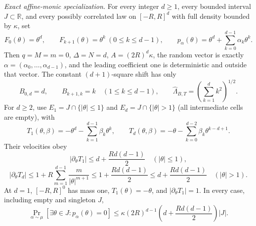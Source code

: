 \begin{theorem}
\emph{Exact affine-monic specialization.} For every integer $d\geq1$, every bounded interval
$J\subset\mathbb R$, and every possibly correlated law on $[-R,R]^d$ with full density bounded by $\kappa$,
set
\begin{equation}
\label{eq:main-display-009}
F_0(\theta)=\theta^d,\qquad F_{k+1}(\theta)=\theta^k\ (0\leq k\leq d-1),\qquad
p_\alpha(\theta)=\theta^d+\sum_{k=0}^{d-1}\alpha_k\theta^k.
\end{equation}
Then $q=M=m=0$, $\Delta=N=d$, $A=(2R)^d\kappa$, the random vector is exactly
$\alpha=(\alpha_0,\ldots,\alpha_{d-1})$, and the leading coefficient one is deterministic and outside that
vector. The constant $(d+1)$-square shift has only
\begin{equation}
\label{eq:main-display-010}
B_{0,d}=d,\qquad B_{k+1,k}=k\quad(1\leq k\leq d-1),\qquad
\widehat\Lambda_{B,T}=\left(\sum_{k=1}^d k^2\right)^{1/2}.
\end{equation}
For $d\geq2$, use $E_1=J\cap\{|\theta|\leq1\}$ and
$E_d=J\cap\{|\theta|>1\}$ (all intermediate cells are empty), with
\begin{equation}
\label{eq:main-display-011}
T_1(\theta,\beta)=-\theta^d-\sum_{k=1}^{d-1}\beta_k\theta^k,
\qquad
T_d(\theta,\beta)=-\theta-\sum_{k=0}^{d-2}\beta_k\theta^{k-d+1}.
\end{equation}
Their velocities obey
\begin{equation}
\label{eq:main-display-012}
|\partial_\theta T_1|\leq d+\frac{Rd(d-1)}2\quad(|\theta|\leq1),
\end{equation}
\begin{equation}
\label{eq:main-display-013}
|\partial_\theta T_d|\leq1+R\sum_{m=1}^{d-1}\frac{m}{|\theta|^{m+1}}
\leq1+\frac{Rd(d-1)}2\leq d+\frac{Rd(d-1)}2\quad(|\theta|>1).
\end{equation}
At $d=1$, $[-R,R]^0$ has mass one, $T_1(\theta)=-\theta$, and
$|\partial_\theta T_1|=1$. In every case, including empty and singleton $J$,
\begin{equation}
\label{eq:main-display-014}
\Pr_{\alpha\sim\mu}[\exists\theta\in J:p_\alpha(\theta)=0]
\leq\kappa(2R)^{d-1}\left(d+\frac{Rd(d-1)}2\right)|J|.
\end{equation}


\end{theorem}
